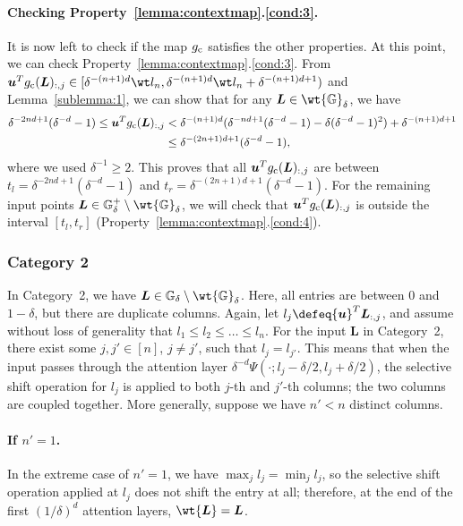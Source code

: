 \documentclass{article} %
\def\vu{{\bm{u}}}
\def\mL{{\bm{L}}}
\def\sG{{\mathbb{G}}}
\begin{document}
\paragraph{Checking Property~\ref{lemma:contextmap}.\ref{cond:3}.}
It is now left to check if the map $g_{\rm c}$ satisfies the other properties.
At this point, we can check Property~\ref{lemma:contextmap}.\ref{cond:3}. 
From 
$\vu^T g_{\rm c}(\mL)_{:,j} \in [\delta^{-(n+1)d} \wt l_n, \delta^{-(n+1)d} \wt l_n + \delta^{-(n+1)d+1})$ and Lemma~\ref{sublemma:1}, we can show that for any $\mL \in \wt {\sG}_{\delta}$, we have
\begin{align*}
    \delta^{-2nd+1}(\delta^{-d} - 1) 
    \leq \vu^T g_{\rm c}(\mL)_{:,j} 
    &< \delta^{-(n+1)d}(\delta^{-nd + 1}(\delta^{-d}-1) - \delta (\delta^{-d} - 1)^2) + \delta^{-(n+1)d+1}\\
    &\leq \delta^{-(2n+1)d+1}(\delta^{-d}-1),
\end{align*}
where we used $\delta^{-1} \geq 2$.
This proves that all $\vu^T g_{\rm c}(\mL)_{:,j}$ are between $t_l = \delta^{-2nd+1}(\delta^{-d} - 1)$ and $t_r = \delta^{-(2n+1)d+1}(\delta^{-d}-1)$.
For the remaining input points $\mL \in \sG^+_{\delta} \setminus \wt {\sG}_{\delta}$, we will check that $\vu^T g_{\rm c}(\mL)_{:,j}$ is outside the interval $[t_l , t_r]$ (Property~\ref{lemma:contextmap}.\ref{cond:4}).

\subsubsection{Category 2}
In Category~2, we have $\mL \in \sG_{\delta}\setminus \wt {\sG}_{\delta}$. Here, all entries are between $0$ and $1-\delta$, but there are duplicate columns.
Again, let $l_j \defeq \vu^T \mL_{:,j}$, and assume without loss of generality that $l_1 \leq l_2 \leq \dots \leq l_n$. 
For the input $\mL$ in Category~2, there exist some $j, j' \in [n]$, $j \neq j'$, such that $l_j = l_{j'}$.
This means that when the input passes through the attention layer $\delta^{-d}\Psi(\cdot; l_j - \delta/2, l_j + \delta/2)$, the selective shift operation for $l_j$ is applied to both $j$-th and $j'$-th columns; the two columns are coupled together.
More generally, suppose we have $n' < n$ distinct columns.

\paragraph{If $n'= 1$.}
In the extreme case of $n' = 1$, we have $\max_j l_j = \min_j l_j$, so the selective shift operation applied at $l_j$ does not shift the entry at all; therefore, at the end of the first $(1/\delta)^d$ attention layers, $\wt \mL = \mL$.
\end{document}
